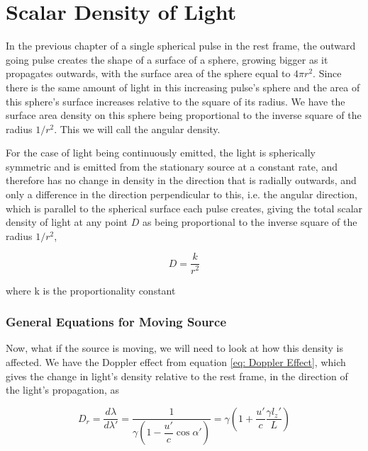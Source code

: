\section{Scalar Density of Light}\label{sect: Field Scalar Density}

In the previous chapter of a single spherical pulse in the rest frame, the outward going pulse creates the shape of a surface of a sphere, growing bigger as it propagates outwards, with the surface area of the sphere equal to $4 \pi r^2$.
Since there is the same amount of light in this increasing pulse's sphere and the area of this sphere's surface increases relative to the square of its radius.
We have the surface area density on this sphere being proportional to the inverse square of the radius $1/r^2$. This we will call the angular density.

For the case of light being continuously emitted, the light is spherically symmetric and is emitted from the stationary source at a constant rate, and therefore has no change in density in the direction that is radially outwards, and only a difference in the direction perpendicular to this, i.e. the angular direction, which is parallel to the spherical surface each pulse creates, giving the total scalar density of light at any point $D$ as being proportional to the inverse square of the radius $1/r^2$,

\begin{equation}
	D = \frac{k}{r^2}
\end{equation}

where k is the proportionality constant

\subsubsection{General Equations for Moving Source}\label{subsubsect: General Equations for Moving Source 0}

Now, what if the source is moving, we will need to look at how this density is affected.
We have the Doppler effect from equation \eqref{eq: Doppler Effect}, which gives the change in light's density relative to the rest frame, in the direction of the light's propagation, as

\begin{equation}
	\label{eq: radial density}
	D_{r} = \frac{d\lambda}{d\lambda{'}} = \frac{1}{ {\gamma} \left(1-\dfrac{u{'}}{c} \cos\alpha{'} \right)} = {\gamma}\left(1 + \dfrac{u'}{c}\frac{\gamma l_z'}{L}\right)
\end{equation}

